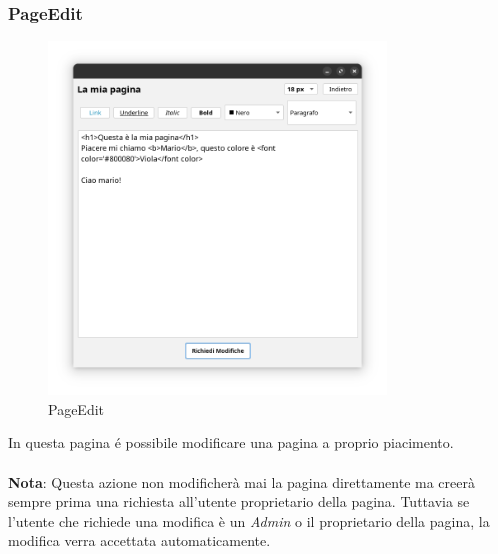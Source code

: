 \documentclass{article}
\begin{document}
	\subsubsection{PageEdit}
	\begin{figure}[htbp]
		\centering
		\includegraphics[width=0.8\textwidth,height=0.8\textheight,keepaspectratio]{page_edit.png}
		\caption{PageEdit}
		\label{fig:6}
	\end{figure}
	
	In questa pagina \'e possibile modificare una pagina a proprio piacimento.
	\\\\
	\textbf{Nota}: Questa azione non modificher\`a mai la pagina direttamente ma creer\`a sempre prima una richiesta all'utente proprietario della pagina. Tuttavia se l'utente che richiede una modifica \`e un {\itshape{Admin}} o il proprietario della pagina, la modifica verra accettata automaticamente.
	
	
	\newpage
	
\end{document}
